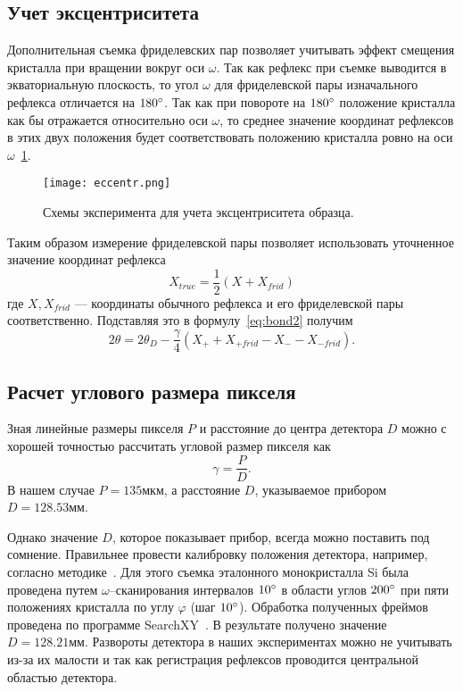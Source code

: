 \subsection{Учет эксцентриситета}
Дополнительная съемка фриделевских пар позволяет учитывать эффект смещения кристалла при вращении вокруг оси $\omega$.
Так как рефлекс при съемке выводится в экваториальную плоскость, то угол $\omega$ для фриделевской пары изначального рефлекса отличается на $180^\circ$.
Так как при повороте на $180^\circ$ положение кристалла как бы отражается относительно оси $\omega$, то среднее значение координат рефлексов в этих двух положения будет соответствовать положению кристалла ровно на оси $\omega$~\ref{fig:eccentr}.

\begin{figure}[ht!]
    \centering
    \texttt{[image: eccentr.png]}
    \caption{Схемы эксперимента для учета эксцентриситета образца.}\label{fig:eccentr}
\end{figure}

Таким образом измерение фриделевской пары позволяет использовать уточненное значение координат рефлекса
\[X_{true} = \frac{1}{2}(X + X_{frid})\]
где $X, X_{frid}$ --- координаты обычного рефлекса и его фриделевской пары соответственно.
Подставляя это в формулу~\ref{eq:bond2} получим
\begin{equation} \label{eq:bond4}
    2\theta = 2\theta_D - \frac{\gamma}{4} (X_{+} + X_{+frid} - X_{-} - X_{-frid}).
\end{equation}
\subsection{Расчет углового размера пикселя}
Зная линейные размеры пикселя $P$ и расстояние до центра детектора $D$ можно с хорошей точностью рассчитать угловой размер пикселя как
\begin{equation} \label{eq:gamma_simple}
    \gamma = \frac{P}{D}.
\end{equation}
В нашем случае $P = 135\unit{мкм}$, а расстояние $D$, указываемое прибором $D = 128.53\unit{мм}$.

Однако значение $D$, которое показывает прибор, всегда можно поставить под сомнение.
Правильнее провести калибровку положения детектора, например, согласно методике~\cite{Panchenko:2023}.
Для этого съемка эталонного монокристалла Si была проведена путем $\omega$--сканирования интервалов $10^\circ$ в области углов $200^\circ$ при пяти положениях кристалла по углу $\varphi$ (шаг $10^\circ$).
Обработка полученных фреймов проведена по программе SearchXY~\cite{Panchenko:2023}.
В результате получено значение $D = 128.21\unit{мм}$.
Развороты детектора в наших экспериментах можно не учитывать из-за их малости и так как регистрация рефлексов проводится центральной областью детектора.

